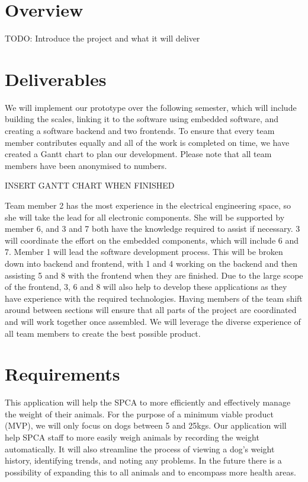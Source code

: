 
\chapter{Overview}

TODO: Introduce the project and what it will deliver

\chapter{Deliverables}

We will implement our prototype over the following semester, which will include building the scales, linking it to the software using embedded software, and creating a software backend and two frontends. To ensure that every team member contributes equally and all of the work is completed on time, we have created a Gantt chart to plan our development.  Please note that all team members have been anonymised to numbers.

INSERT GANTT CHART WHEN FINISHED

Team member 2 has the most experience in the electrical engineering space, so she will take the lead for all electronic components. She will be supported by member 6, and 3 and 7 both have the knowledge required to assist if necessary. 3 will coordinate the effort on the embedded components, which will include 6 and 7. Member 1 will lead the software development process. This will be broken down into backend and frontend, with 1 and 4 working on the backend and then assisting 5 and 8 with the frontend when they are finished. Due to the large scope of the frontend, 3, 6 and 8 will also help to develop these applications as they have experience with the required technologies. Having members of the team shift around between sections will ensure that all parts of the project are coordinated and will work together once assembled. We will leverage the diverse experience of all team members to create the best possible product. 


\chapter{Requirements}

This application will help the SPCA to more efficiently and effectively manage the weight of their animals. For the purpose of a minimum viable product (MVP), we will only focus on dogs between 5 and 25kgs. Our application will help SPCA staff to more easily weigh animals by recording the weight automatically. It will also streamline the process of viewing a dog’s weight history, identifying trends, and noting any problems. In the future there is a possibility of expanding this to all animals and to encompass more health areas. 

